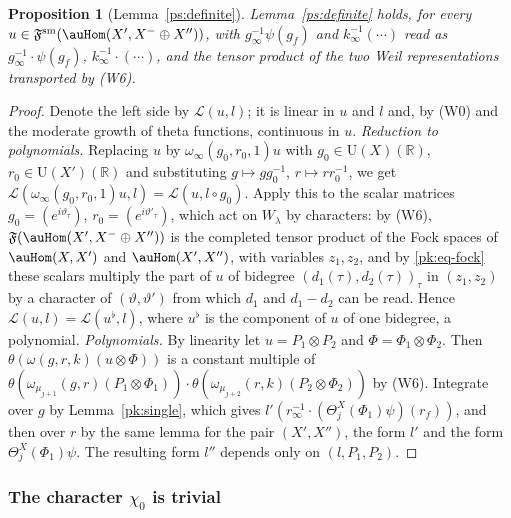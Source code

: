 \documentclass[10pt]{amsart}
\newtheorem{proposition}[theorem]{Proposition}
\theoremstyle{definition}
\theoremstyle{remark}
\newcommand{\R}{\mathbb R}
\providecommand{\auU}{\mathrm U}
\begin{document}
\begin{proposition}[Lemma~\ref{ps:definite}]\label{pk:definite}
Lemma~\ref{ps:definite} holds, for every $u\in\mathfrak F^{\mathrm{sm}}(\auHom(X',X^-\oplus X''))$,
with $g_\infty^{-1}\psi(g_f)$ and $k_\infty^{-1}(\cdots)$ read as $g_\infty^{-1}\cdot\psi(g_f)$,
$k_\infty^{-1}\cdot(\cdots)$, and the tensor product of the two Weil representations transported
by (W6).
\end{proposition}
\begin{proof}
Denote the left side by $\mathcal L(u,l)$; it is linear in $u$ and $l$ and, by (W0) and the
moderate growth of theta functions, continuous in $u$. \emph{Reduction to polynomials.} Replacing
$u$ by $\omega_\infty(g_0,r_0,1)u$ with $g_0\in\auU(X)(\R)$, $r_0\in\auU(X')(\R)$ and substituting
$g\mapsto gg_0^{-1}$, $r\mapsto rr_0^{-1}$, we get $\mathcal L(\omega_\infty(g_0,r_0,1)u,l)=
\mathcal L(u,l\circ g_0)$. Apply this to the scalar matrices $g_0=(e^{i\vartheta_\tau})$,
$r_0=(e^{i\vartheta'_\tau})$, which act on $W_\lambda$ by characters: by (W6), $\mathfrak F
(\auHom(X',X^-\oplus X''))$ is the completed tensor product of the Fock spaces of $\auHom(X,X')$
and $\auHom(X',X'')$, with variables $z_1,z_2$, and by \eqref{pk:eq-fock} these scalars multiply
the part of $u$ of bidegree $(d_1(\tau),d_2(\tau))_\tau$ in $(z_1,z_2)$ by a character of
$(\vartheta,\vartheta')$ from which $d_1$ and $d_1-d_2$ can be read. Hence $\mathcal L(u,l)=
\mathcal L(u^\flat,l)$, where $u^\flat$ is the component of $u$ of one bidegree, a polynomial.
\emph{Polynomials.} By linearity let $u=P_1\otimes P_2$ and $\Phi=\Phi_1\otimes\Phi_2$. Then
$\theta(\omega(g,r,k)(u\otimes\Phi))$ is a constant multiple of $\theta(\omega_{\mu_{j+1}}(g,r)
(P_1\otimes\Phi_1))\cdot\theta(\omega_{\mu_{j+2}}(r,k)(P_2\otimes\Phi_2))$ by (W6). Integrate over
$g$ by Lemma~\ref{pk:single}, which gives $l'(r_\infty^{-1}\cdot(\Theta^X_j(\Phi_1)\psi)(r_f))$,
and then over $r$ by the same lemma for the pair $(X',X'')$, the form $l'$ and the form
$\Theta^X_j(\Phi_1)\psi$. The resulting form $l''$ depends only on $(l,P_1,P_2)$.
\end{proof}

\subsubsection{The character $\chi_0$ is trivial}\label{pk:ss-chi0}
\end{document}
